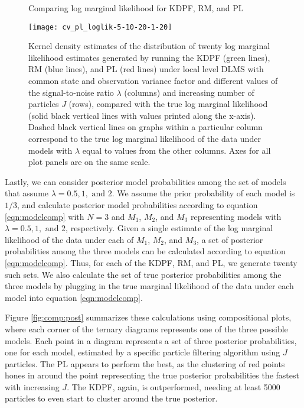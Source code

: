 \begin{figure}[ht]
\ssp
\centering
\caption{Comparing log marginal likelihood for KDPF, RM, and PL} \label{fig:comp:loglik}
\texttt{[image: cv\_pl\_loglik-5-10-20-1-20]}
\caption*{Kernel density estimates of the distribution of twenty log marginal likelihood estimates generated by running the KDPF (green lines), RM (blue lines), and PL (red lines) under local level DLMS with common state and observation variance factor and different values of the signal-to-noise ratio $\lambda$ (columns) and increasing number of particles $J$ (rows), compared with the true log marginal likelihood (solid black vertical lines with values printed along the x-axis). Dashed black vertical lines on graphs within a particular column correspond to the true log marginal likelihood of the data under models with $\lambda$ equal to values from the other columns. Axes for all plot panels are on the same scale.}
\end{figure}

Lastly, we can consider posterior model probabilities among the set of models that assume $\lambda = 0.5, 1, \mbox{ and } 2$. We assume the prior probability of each model is $1/3$, and calculate posterior model probabilities according to equation \eqref{eqn:modelcomp} with $N = 3$ and $M_1$, $M_2$, and $M_3$ representing models with $\lambda = 0.5, 1, \mbox{ and } 2$, respectively. Given a single estimate of the log marginal likelihood of the data under each of $M_1$, $M_2$, and $M_3$, a set of posterior probabilities among the three models can be calculated according to equation \eqref{eqn:modelcomp}. Thus, for each of the KDPF, RM, and PL, we generate twenty such sets. We also calculate the set of true posterior probabilities among the three models by plugging in the true marginal likelihood of the data under each model into equation \eqref{eqn:modelcomp}.

Figure \ref{fig:comp:post} summarizes these calculations using compositional plots, where each corner of the ternary diagrams represents one of the three possible models. Each point in a diagram represents a set of three posterior probabilities, one for each model, estimated by a specific particle filtering algorithm using $J$ particles. The PL appears to perform the best, as the clustering of red points hones in around the point representing the true posterior probabilities the fastest with increasing $J$. The KDPF, again, is outperformed, needing at least 5000 particles to even start to cluster around the true posterior.

